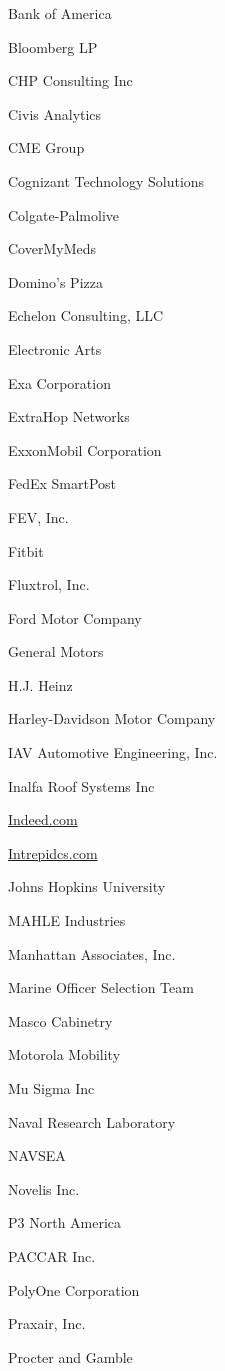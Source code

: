 \documentclass[twoside]{article}
\begin{document}
\begin{center}
\begin{multicols}{5}
\begin{FlushLeft}
\begin{compactitem}
\item Bank of America
\item Bloomberg LP
\item CHP Consulting Inc
\item Civis Analytics
\item CME Group
\item Cognizant Technology Solutions
\item Colgate-Palmolive
\item CoverMyMeds
\item Domino's Pizza
\item Echelon Consulting, LLC
\item Electronic Arts
\item Exa Corporation
\item ExtraHop Networks
\item ExxonMobil Corporation
\item FedEx SmartPost
\item FEV, Inc.
\item Fitbit
\item Fluxtrol, Inc.
\item Ford Motor Company
\item General Motors
\item H.J. Heinz
\item Harley-Davidson Motor Company
\item IAV Automotive Engineering, Inc.
\item Inalfa Roof Systems Inc
\item \url{Indeed.com}
\item \url{Intrepidcs.com}
\item Johns Hopkins University
\item MAHLE Industries
\item Manhattan Associates, Inc.
\item Marine Officer Selection Team
\item Masco Cabinetry
\item Motorola Mobility
\item Mu Sigma Inc
\item Naval Research Laboratory
\item NAVSEA
\item Novelis Inc.
\item P3 North America
\item PACCAR Inc.
\item PolyOne Corporation
\item Praxair, Inc.
\item Procter and Gamble

\end{compactitem}
\end{FlushLeft}
\end{multicols}
\end{center}
\end{document}

